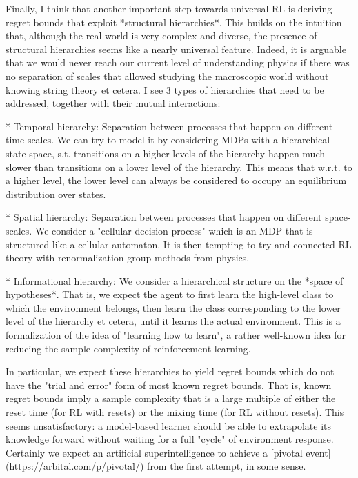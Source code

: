 \documentclass[a4paper]{article}
\begin{document}
Finally, I think that another important step towards universal RL is deriving regret bounds that exploit *structural hierarchies*. This builds on the intuition that, although the real world is very complex and diverse, the presence of structural hierarchies seems like a nearly universal feature. Indeed, it is arguable that we would never reach our current level of understanding physics if there was no separation of scales that allowed studying the macroscopic world without knowing string theory et cetera. I see 3 types of hierarchies that need to be addressed, together with their mutual interactions:

* Temporal hierarchy: Separation between processes that happen on different time-scales. We can try to model it by considering MDPs with a hierarchical state-space, s.t. transitions on a higher levels of the hierarchy happen much slower than transitions on a lower level of the hierarchy. This means that w.r.t. to a higher level, the lower level can always be considered to occupy an equilibrium distribution over states.

* Spatial hierarchy: Separation between processes that happen on different space-scales. We consider a "cellular decision process" which is an MDP that is structured like a cellular automaton. It is then tempting to try and connected RL theory with renormalization group methods from physics.

* Informational hierarchy: We consider a hierarchical structure on the *space of hypotheses*. That is, we expect the agent to first learn the high-level class to which the environment belongs, then learn the class corresponding to the lower level of the hierarchy et cetera, until it learns the actual environment. This is a formalization of the idea of "learning how to learn", a rather well-known idea for reducing the sample complexity of reinforcement learning.

In particular, we expect these hierarchies to yield regret bounds which do not have the "trial and error" form of most known regret bounds. That is, known regret bounds imply a sample complexity that is a large multiple of either the reset time (for RL with resets) or the mixing time (for RL without resets). This seems unsatisfactory: a model-based learner should be able to extrapolate its knowledge forward without waiting for a full "cycle" of environment response. Certainly we expect an artificial superintelligence to achieve a [pivotal event](https://arbital.com/p/pivotal/) from the first attempt, in some sense.
\end{document}
